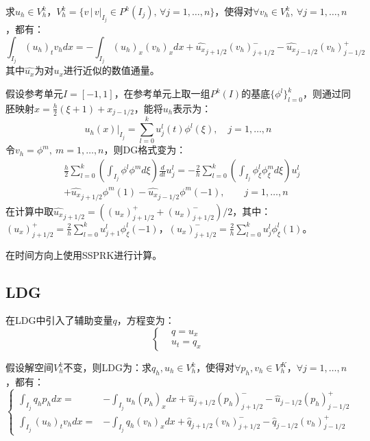 \documentclass[12pt, a4paper]{ctexart}
\begin{document}
	求$u_h \in V_h^k$，$V_h^k = \{ v \, | \, v|_{I_j} \in P^k(I_j), \, \forall j = 1, \dots,n \}$，使得对$\forall v_h \in V_h^k, \  \forall j = 1,\dots,n$，都有：
	\begin{equation*}
	\int_{I_j} (u_h)_t v_h dx = - \int_{I_j} (u_h)_x (v_h)_x dx + \hat{u_x}_{j+1/2}(v_h)_{j+1/2}^- - \hat{u_x}_{j-1/2} (v_h)_{j-1/2}^+
	\end{equation*}
	其中$\hat{u_x}$为对$u_x$进行近似的数值通量。
	
	假设参考单元$I = [-1,1]$，在参考单元上取一组$P^k(I)$的基底$\{ \phi^l \}_{l=0}^k$，则通过同胚映射$ x = \frac{h}{2} (\xi + 1) + x_{j-1/2}$，能将$u_h$表示为：
	$$
	u_h(x) |_{I_j} = \sum_{l=0}^k u_j^l(t) \phi^l(\xi), \quad j = 1,\dots,n
	$$
	令$v_h = \phi^m, \  m = 1,\dots,n$，则DG格式变为：
	\begin{equation*}
	\begin{split}
	& \frac{h}{2} \sum_{l=0}^k (\int_{I_j} \phi^l \phi^m d\xi) \frac{d}{dt}u_j^l = - \frac{2}{h} \sum_{l=0}^k (\int_{I_j} \phi^l_{\xi} \phi^m_{\xi} d\xi) u_j^l\\
	& + \hat{u_x}_{j+1/2} \phi^m(1) - \hat{u_x}_{j-1/2} \phi^m(-1), \qquad j = 1, \dots, n
	\end{split}
	\end{equation*}
	在计算中取$\hat{u_x}_{j+1/2} = ((u_x)_{j+1/2}^+ + (u_x)_{j+1/2}^-)/2$，其中：$(u_x)_{j+1/2}^+ = \frac{2}{h}\sum_{l=0}^k u_{j+1}^l \phi^l_{\xi}(-1)$，$(u_x)_{j+1/2}^- = \frac{2}{h}\sum_{l=0}^k u_j^l \phi^l_{\xi}(1)$。
	
	在时间方向上使用SSPRK进行计算。
	
	\subsection{LDG}
	
	在LDG中引入了辅助变量$q$，方程变为：
	\begin{equation*}
	\begin{cases}
	& q = u_x\\
	& u_t = q_x
	\end{cases}
	\end{equation*}
	
	假设解空间$V_h^k$不变，则LDG为：求$q_h, u_h \in V_h^k$，使得对$\forall p_h, v_h \in V_h^K$，$\forall j = 1, \dots,n$，都有：
	\begin{equation*}
	\begin{cases}
	\int_{I_j} q_h p_h dx = & - \int_{I_j} u_h (p_h)_x dx + \hat{u}_{j+1/2} (p_h)_{j+1/2}^- - \hat{u}_{j-1/2} (p_h)_{j-1/2}^+\\
	\int_{I_j} (u_h)_t v_h dx = & - \int_{I_j} q_h (v_h)_x dx + \hat{q}_{j+1/2}(v_h)_{j+1/2}^- - \hat{q}_{j-1/2} (v_h)_{j-1/2}^+
	\end{cases}
	\end{equation*}
	
\end{document}
